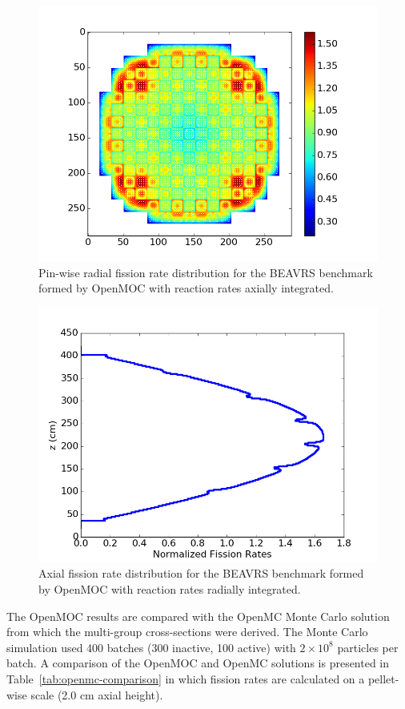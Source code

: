\begin{figure}[ht!]
	\centering
	\includegraphics[width=0.8\linewidth]{figures/results/rr-plots/beavrs-3d-radial.png}
	\caption{Pin-wise radial fission rate distribution for the BEAVRS benchmark formed by OpenMOC with reaction rates axially integrated.}
	\label{fig:full-core-radial}
\end{figure}

\begin{figure}[ht!]
	\centering
	\includegraphics[width=0.8\linewidth]{figures/results/rr-plots/beavrs-3d-axial.png}
	\caption{Axial fission rate distribution for the BEAVRS benchmark formed by OpenMOC with reaction rates radially integrated.}
	\label{fig:full-core-axial}
\end{figure}

\newpage
The OpenMOC results are compared with the OpenMC Monte Carlo solution from which the multi-group cross-sections were derived. The Monte Carlo simulation used 400 batches (300 inactive, 100 active) with $2 \times 10^8$ particles per batch. A comparison of the OpenMOC and OpenMC solutions is presented in Table~\ref{tab:openmc-comparison} in which fission rates are calculated on a pellet-wise scale (2.0 cm axial height).

